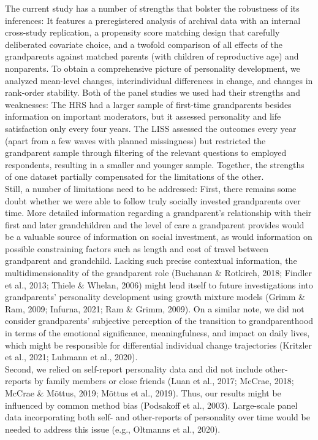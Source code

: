 \documentclass[
  english,
  man, noextraspace,floatsintext]{apa7}
\begin{document}
The current study has a number of strengths that bolster the robustness of its inferences: It features a preregistered analysis of archival data with an internal cross-study replication, a propensity score matching design that carefully deliberated covariate choice, and a twofold comparison of all effects of the grandparents against matched parents (with children of reproductive age) and nonparents. To obtain a comprehensive picture of personality development, we analyzed mean-level changes, interindividual differences in change, and changes in rank-order stability. Both of the panel studies we used had their strengths and weaknesses: The HRS had a larger sample of first-time grandparents besides information on important moderators, but it assessed personality and life satisfaction only every four years. The LISS assessed the outcomes every year (apart from a few waves with planned missingness) but restricted the grandparent sample through filtering of the relevant questions to employed respondents, resulting in a smaller and younger sample. Together, the strengths of one dataset partially compensated for the limitations of the other.\\
Still, a number of limitations need to be addressed: First, there remains some doubt whether we were able to follow truly socially invested grandparents over time. More detailed information regarding a grandparent's relationship with their first and later grandchildren and the level of care a grandparent provides would be a valuable source of information on social investment, as would information on possible constraining factors such as length and cost of travel between grandparent and grandchild. Lacking such precise contextual information, the multidimensionality of the grandparent role (Buchanan \& Rotkirch, 2018; Findler et al., 2013; Thiele \& Whelan, 2006) might lend itself to future investigations into grandparents' personality development using growth mixture models (Grimm \& Ram, 2009; Infurna, 2021; Ram \& Grimm, 2009). On a similar note, we did not consider grandparents' subjective perception of the transition to grandparenthood in terms of the emotional significance, meaningfulness, and impact on daily lives, which might be responsible for differential individual change trajectories (Kritzler et al., 2021; Luhmann et al., 2020).\\
Second, we relied on self-report personality data and did not include other-reports by family members or close friends (Luan et al., 2017; McCrae, 2018; McCrae \& Mõttus, 2019; Mõttus et al., 2019). Thus, our results might be influenced by common method bias (Podsakoff et al., 2003). Large-scale panel data incorporating both self- and other-reports of personality over time would be needed to address this issue (e.g., Oltmanns et al., 2020).\\
\end{document}
